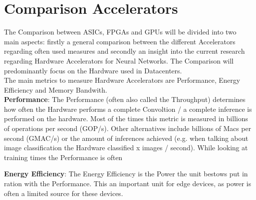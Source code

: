 \documentclass[conference]{IEEEtran}
\begin{document}
\section{Comparison Accelerators}
The Comparison between ASICs, FPGAs and GPUs will be divided into two main aspects: firstly a general comparison between the different Accelerators regarding often used measures and secondly an insight into the current research regarding Hardware Accelerators for Neural Networks. The Comparison will predominantly focus on the Hardware used in Datacenters.
\\
The main metrics to measure Hardware Accelerators are Performance, Energy Efficiency and Memory Bandwith.
\\

\textbf{Performance}:
The Performance (often also called the Throughput) determines how often the Hardware performs a complete Convoltion / a complete inference is performed on the hardware. Most of the times this metric is measured in billions of operations per second (GOP/s). Other alternatives include billions of Macs per second (GMAC/s) or the amount of inferences achieved (e.g. when talking about image classification the Hardware classified x images / second). While looking at training times the Performance is often 

\textbf{Energy Efficiency}:
The Energy Efficiency is the Power the unit bestows put in ration with the Performance. This an important unit for edge devices, as power is often a limited source for these devices.
\end{document}
